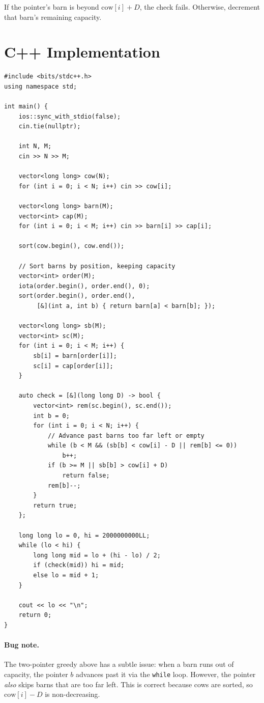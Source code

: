 \documentclass[11pt,a4paper]{article}
\begin{document}
If the pointer's barn is beyond $\mathrm{cow}[i] + D$, the check fails.
Otherwise, decrement that barn's remaining capacity.

\section{C++ Implementation}

\begin{lstlisting}
#include <bits/stdc++.h>
using namespace std;

int main() {
    ios::sync_with_stdio(false);
    cin.tie(nullptr);

    int N, M;
    cin >> N >> M;

    vector<long long> cow(N);
    for (int i = 0; i < N; i++) cin >> cow[i];

    vector<long long> barn(M);
    vector<int> cap(M);
    for (int i = 0; i < M; i++) cin >> barn[i] >> cap[i];

    sort(cow.begin(), cow.end());

    // Sort barns by position, keeping capacity
    vector<int> order(M);
    iota(order.begin(), order.end(), 0);
    sort(order.begin(), order.end(),
         [&](int a, int b) { return barn[a] < barn[b]; });

    vector<long long> sb(M);
    vector<int> sc(M);
    for (int i = 0; i < M; i++) {
        sb[i] = barn[order[i]];
        sc[i] = cap[order[i]];
    }

    auto check = [&](long long D) -> bool {
        vector<int> rem(sc.begin(), sc.end());
        int b = 0;
        for (int i = 0; i < N; i++) {
            // Advance past barns too far left or empty
            while (b < M && (sb[b] < cow[i] - D || rem[b] <= 0))
                b++;
            if (b >= M || sb[b] > cow[i] + D)
                return false;
            rem[b]--;
        }
        return true;
    };

    long long lo = 0, hi = 2000000000LL;
    while (lo < hi) {
        long long mid = lo + (hi - lo) / 2;
        if (check(mid)) hi = mid;
        else lo = mid + 1;
    }

    cout << lo << "\n";
    return 0;
}
\end{lstlisting}

\paragraph{Bug note.} The two-pointer greedy above has a subtle issue:
when a barn runs out of capacity, the pointer $b$ advances past it via
the \texttt{while} loop. However, the pointer \emph{also} skips barns
that are too far left. This is correct because cows are sorted, so
$\mathrm{cow}[i] - D$ is non-decreasing.
\end{document}
